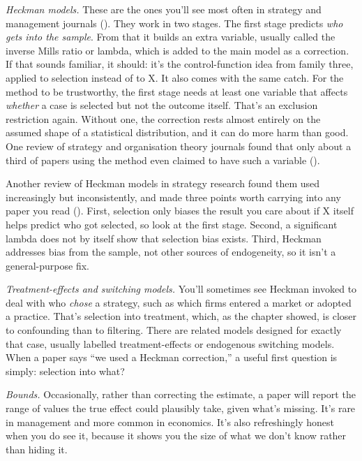 \documentclass[
]{book}
\begin{document}
\emph{Heckman models.} These are the ones you'll see most often in strategy and management journals (). They work in two stages. The first stage predicts \emph{who gets into the sample}. From that it builds an extra variable, usually called the inverse Mills ratio or lambda, which is added to the main model as a correction. If that sounds familiar, it should: it's the control-function idea from family three, applied to selection instead of to X. It also comes with the same catch. For the method to be trustworthy, the first stage needs at least one variable that affects \emph{whether} a case is selected but not the outcome itself. That's an exclusion restriction again. Without one, the correction rests almost entirely on the assumed shape of a statistical distribution, and it can do more harm than good. One review of strategy and organisation theory journals found that only about a third of papers using the method even claimed to have such a variable ().

Another review of Heckman models in strategy research found them used increasingly but inconsistently, and made three points worth carrying into any paper you read (). First, selection only biases the result you care about if X itself helps predict who got selected, so look at the first stage. Second, a significant lambda does not by itself show that selection bias exists. Third, Heckman addresses bias from the sample, not other sources of endogeneity, so it isn't a general-purpose fix.

\emph{Treatment-effects and switching models.} You'll sometimes see Heckman invoked to deal with who \emph{chose} a strategy, such as which firms entered a market or adopted a practice. That's selection into treatment, which, as the chapter showed, is closer to confounding than to filtering. There are related models designed for exactly that case, usually labelled treatment-effects or endogenous switching models. When a paper says ``we used a Heckman correction,'' a useful first question is simply: selection into what?

\emph{Bounds.} Occasionally, rather than correcting the estimate, a paper will report the range of values the true effect could plausibly take, given what's missing. It's rare in management and more common in economics. It's also refreshingly honest when you do see it, because it shows you the size of what we don't know rather than hiding it.
\end{document}
